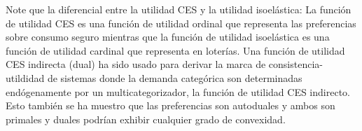\begin{definition}
Note que la diferencial entre la utilidad CES y la utilidad isoelástica: La función de utilidad CES es una función de utilidad ordinal que representa las preferencias sobre consumo seguro %
mientras que la función de utilidad isoelástica es una función de utilidad cardinal que representa en loterías. Una función de utilidad CES indirecta (dual) ha sido usado para derivar la marca de consistencia-utildidad de sistemas donde la demanda categórica son determinadas endógenamente por un multicategorizador, la función de utilidad CES indirecto. Esto también se ha muestro que las preferencias son autoduales y ambos son primales y duales %
podrían exhibir cualquier grado de convexidad.
\end{definition}